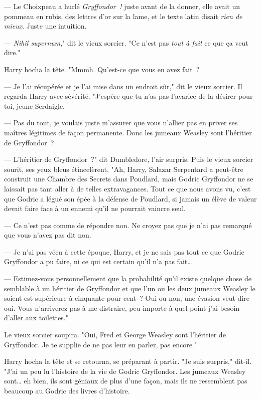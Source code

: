--- Le Choixpeau a hurlé \emph{Gryffondor~!} juste avant de la donner, elle avait un pommeau en rubis, des lettres d'or sur la lame, et le texte latin disait \emph{rien de mieux}. Juste une intuition.

--- \emph{Nihil supernum}," dit le vieux sorcier. "Ce n'est pas \emph{tout à fait} ce que ça veut dire."

Harry hocha la tête. "Mmmh. Qu'est-ce que vous en avez fait~?

--- Je l'ai récupérée et je l'ai mise dans un endroit sûr," dit le vieux sorcier. Il regarda Harry avec sévérité. "J'espère que tu n'as pas l'avarice de la désirer pour toi, jeune Serdaigle.

--- Pas du tout, je voulais juste m'assurer que vous n'alliez pas en priver ses maîtres légitimes de façon permanente. Donc les jumeaux Weasley sont l'héritier de Gryffondor~?

--- L'héritier de Gryffondor~?" dit Dumbledore, l'air surpris. Puis le vieux sorcier sourit, ses yeux bleus étincelèrent. "Ah, Harry, Salazar Serpentard a peut-être construit une Chambre des Secrets dans Poudlard, mais Godric Gryffondor ne se laissait pas tant aller à de telles extravagances. Tout ce que nous avons vu, c'est que Godric a légué son épée à la défense de Poudlard, si jamais un élève de valeur devait faire face à un ennemi qu'il ne pourrait vaincre seul.

--- Ce n'est pas comme de répondre non. Ne croyez pas que je n'ai pas remarqué que vous n'avez pas dit non.

--- Je n'ai pas vécu à cette époque, Harry, et je ne sais pas tout ce que Godric Gryffondor a pu faire, ni ce qui est certain qu'il n'a pas fait…

--- Estimez-vous personnellement que la probabilité qu'il existe quelque chose de semblable à un héritier de Gryffondor et que l'un ou les deux jumeaux Weasley le soient est supérieure à cinquante pour cent~? Oui ou non, une évasion veut dire oui. Vous n'arriverez pas à me distraire, peu importe à quel point j'ai besoin d'aller aux toilettes."

Le vieux sorcier soupira. "Oui, Fred et George Weasley sont l'héritier de Gryffondor. Je te supplie de ne pas leur en parler, pas encore."

Harry hocha la tête et se retourna, se préparant à partir. "Je suis surpris," dit-il. "J'ai un peu lu l'histoire de la vie de Godric Gryffondor. Les jumeaux Weasley sont… eh bien, ils sont géniaux de plus d'une façon, mais ils ne ressemblent pas beaucoup au Godric des livres d'histoire.

